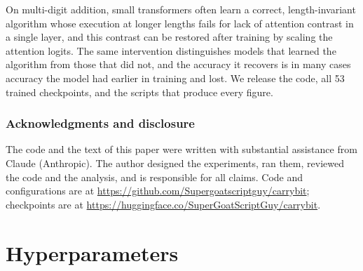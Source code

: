 \documentclass{article}
\begin{document}
On multi-digit addition, small transformers often learn a correct, length-invariant algorithm whose execution at longer lengths fails for lack of attention contrast in a single layer, and this contrast can be restored after training by scaling the attention logits. The same intervention distinguishes models that learned the algorithm from those that did not, and the accuracy it recovers is in many cases accuracy the model had earlier in training and lost. We release the code, all 53 trained checkpoints, and the scripts that produce every figure.

\subsubsection*{Acknowledgments and disclosure}
The code and the text of this paper were written with substantial assistance from Claude (Anthropic). The author designed the experiments, ran them, reviewed the code and the analysis, and is responsible for all claims. Code and configurations are at \url{https://github.com/Supergoatscriptguy/carrybit}; checkpoints are at \url{https://huggingface.co/SuperGoatScriptGuy/carrybit}.




\appendix

\section{Hyperparameters}
\label{app:hyper}
\end{document}
